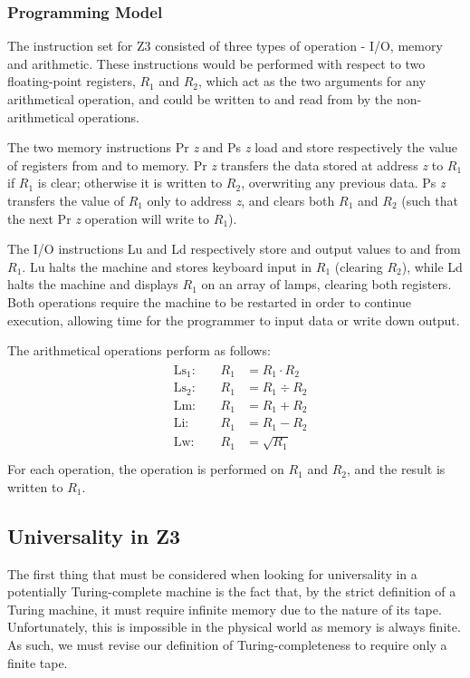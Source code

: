 \documentclass[Master.tex]{subfiles}
\begin{document}
\subsubsection{Programming Model}

The instruction set for Z3 consisted of three types of operation - I/O, memory and arithmetic. These instructions would be performed with respect to two floating-point registers, $R_1$ and $R_2$, which act as the two arguments for any arithmetical operation, and could be written to and read from by the non-arithmetical operations. 

The two memory instructions Pr \textit{z} and Ps \textit{z} load and store respectively the value of registers from and to memory. Pr \textit{z} transfers the data stored at address \textit{z} to $R_1$ if $R_1$ is clear; otherwise it is written to $R_2$, overwriting any previous data. Ps \textit{z} transfers the value of $R_1$ only to address \textit{z}, and clears both $R_1$ and $R_2$ (such that the next Pr \textit{z} operation will write to $R_1$). 

The I/O instructions Lu and Ld respectively store and output values to and from $R_1$. Lu halts the machine and stores keyboard input in $R_1$ (clearing $R_2$), while Ld halts the machine and displays $R_1$ on an array of lamps, clearing both registers. Both operations require the machine to be restarted in order to continue execution, allowing time for the programmer to input data or write down output.

The arithmetical operations perform as follows:
\begin{gather*}
\begin{aligned}
&\mathrm{Ls_1}:\quad	&R_1 &= R_1 \cdot R_2 \\
&\mathrm{Ls_2}:\quad	&R_1 &= R_1 \div R_2 \\
&\mathrm{Lm}:\quad	&R_1 &= R_1 + R_2 \\
&\mathrm{Li}:\quad	&R_1 &= R_1 - R_2 \\
&\mathrm{Lw}:\quad	&R_1 &= \sqrt{R_1} \\
\end{aligned}
\end{gather*}
For each operation, the operation is performed on $R_1$ and $R_2$, and the result is written to $R_1$. 
\subsection{Universality in Z3}

The first thing that must be considered when looking for universality in a potentially Turing-complete machine is the fact that, by the strict definition of a Turing machine, it must require infinite memory due to the nature of its tape. Unfortunately, this is impossible in the physical world as memory is always finite. As such, we must revise our definition of Turing-completeness to require only a finite tape.
\end{document}
